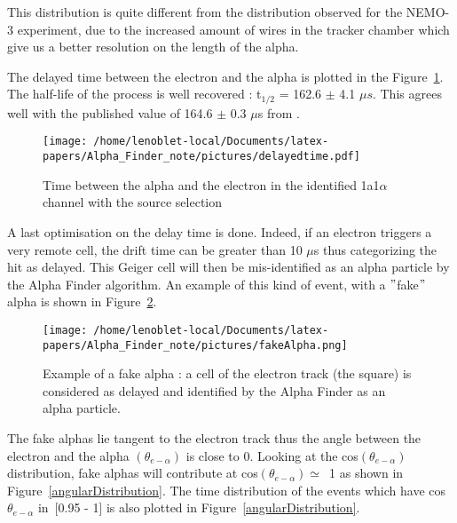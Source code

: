 \documentclass[main.tex]{subfiles}
\begin{document}
\noindent This distribution is quite different from the distribution observed for the NEMO-3 experiment, due to the increased amount of wires in the tracker chamber which give us a better resolution on the length of the alpha. 


\bigskip


\noindent The delayed time between the electron and the alpha is plotted in the Figure~\ref{delayedtimetopology}. The half-life of the process is well recovered : t$_{\text{1/2}}$ = 162.6 $\pm$ 4.1 $\mu s$. This agrees well with the published value of 164.6 $\pm$ 0.3 $\mu$s from \cite{NuclearDataSheet210}.


\begin{figure}[h!]
\begin{center}
\texttt{[image: /home/lenoblet-local/Documents/latex-papers/Alpha\_Finder\_note/pictures/delayedtime.pdf]}
\caption{Time between the alpha and the electron in the identified 1a1$\alpha$ channel with the source selection}
\label{delayedtimetopology}
\end{center}
\end{figure}


\bigskip


\noindent A last optimisation on the delay time is done. Indeed, if an electron triggers a very remote cell, the drift time can be greater than 10 $\mu$s thus categorizing the hit as delayed. This Geiger cell will then be mis-identified as an alpha particle by the Alpha Finder algorithm. An example of this kind of event, with a $"$fake$"$ alpha is shown in Figure~\ref{fakeAlpha}.


\begin{figure}[h!]
\begin{center}
\texttt{[image: /home/lenoblet-local/Documents/latex-papers/Alpha\_Finder\_note/pictures/fakeAlpha.png]}
\caption{Example of a fake alpha : a cell of the electron track (the square) is considered as delayed and identified by the Alpha Finder as an alpha particle.}
\label{fakeAlpha}
\end{center}
\end{figure}


\bigskip


\noindent The fake alphas lie tangent to the electron track thus the angle between the electron and the alpha $(\theta_{e-\alpha})$ is close to 0. Looking at the cos$( \theta_{e-\alpha})$ distribution, fake alphas will contribute at cos$(\theta_{e-\alpha}) \simeq$~1 as shown in Figure~\ref{angularDistribution}. The time distribution of the events which have cos $\theta_{e-\alpha}$ in~[0.95 - 1] is also plotted in Figure~\ref{angularDistribution}.
\end{document}
